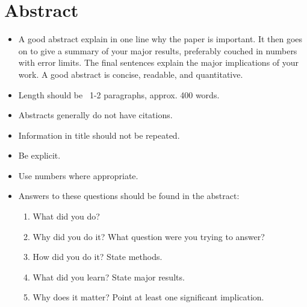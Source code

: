 \chapter*{\centering Abstract}
  \begin{itemize}
   \item A good abstract explain in one line why the paper is important. It then goes on to give a summary of your major results, preferably couched in numbers with error limits. The final sentences explain the major implications of your work. A good abstract is concise, readable, and quantitative.
   \item Length should be ~1-2 paragraphs, approx. 400 words.
   \item Abstracts generally do not have citations.
   \item Information in title should not be repeated.
   \item Be explicit.
   \item Use numbers where appropriate.
   \item Answers to these questions should be found in the abstract:
   \begin{enumerate}
    \item What did you do?
    \item Why did you do it? What question were you trying to answer?
    \item How did you do it? State methods.
    \item What did you learn? State major results.
    \item Why does it matter? Point at least one significant implication.
   \end{enumerate}
  \end{itemize}